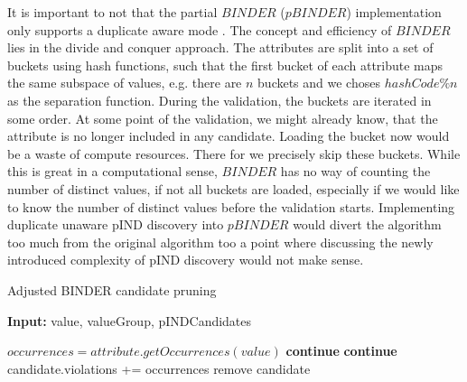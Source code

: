 It is important to not that the partial $BINDER$ ($pBINDER$) implementation only supports a duplicate aware mode %
. The concept and efficiency of $BINDER$ lies in the divide and conquer approach. The attributes are split into a set of buckets using hash functions, such that the first bucket of each attribute maps the same subspace of values, e.g. there are $n$ buckets and we choses $hashCode \% n$ as the separation function. During the validation, the buckets are iterated in some order. At some point of the validation, we might already know, that the attribute is no longer included in any candidate. Loading the bucket now would be a waste of compute resources. There for we precisely skip these buckets. While this is great in a computational sense, $BINDER$ has no way of counting the number of distinct values, if not all buckets are loaded, especially if we would like to know the number of distinct values before the validation starts. Implementing duplicate unaware pIND discovery into $pBINDER$ would divert the algorithm too much from the original algorithm too a point where discussing the newly introduced complexity of pIND discovery would not make sense.



\begin{algorithm}
    \caption{Adjusted BINDER candidate pruning}\label{alg:BINDER_prune}
    \hspace*{\algorithmicindent} \textbf{Input:} value, valueGroup, pINDCandidates
    \begin{algorithmic}[1]
        \State $occurrences = attribute.getOccurrences(value)$
                \State \textbf{continue}
            \EndIf
                \State \textbf{continue}
            \EndIf
            \State candidate.violations += occurrences
                \State remove candidate
            \EndIf
        \EndFor
    \EndFor
    \end{algorithmic}
\end{algorithm}




